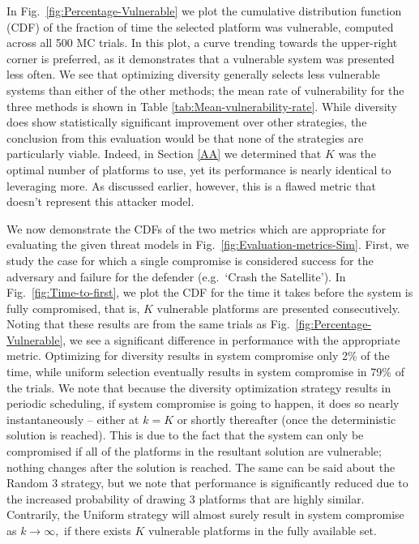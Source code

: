 \documentclass{acm_proc_article-sp}
\begin{document}
In Fig.\ \ref{fig:Percentage-Vulnerable} we plot the cumulative distribution function (CDF) of the fraction of time the selected platform was vulnerable, computed across all 500 MC trials. In this plot, a curve trending towards the upper-right corner is preferred, as it demonstrates that a vulnerable system was presented less often. We see that optimizing diversity generally selects less vulnerable systems than either of the other methods; the mean rate of vulnerability for the three methods is shown in Table \ref{tab:Mean-vulnerability-rate}. While diversity does show statistically significant improvement over other strategies, the conclusion from this evaluation would be that none of the strategies are particularly viable. Indeed, in Section \ref{AA} we determined that $K$ was the optimal number of platforms to use, yet its performance is nearly identical to leveraging more. As discussed earlier, however, this is a flawed metric that doesn't represent this attacker model.

We now demonstrate the CDFs of the two metrics which are appropriate for evaluating the given threat models in Fig.\ \ref{fig:Evaluation-metrics-Sim}. First, we study the case for which a single compromise is considered success for the adversary and failure for the defender (e.g.\ `Crash the Satellite'). In Fig.\ \ref{fig:Time-to-first}, we plot the CDF for the time it takes before the system is fully compromised, that is, $K$ vulnerable platforms are presented consecutively. Noting that these results are from the same trials as Fig.\ \ref{fig:Percentage-Vulnerable}, we see a significant difference in performance with the appropriate metric. Optimizing for diversity results in system compromise only 2\% of the time, while uniform selection eventually results in system compromise in 79\% of the trials. We note that because the diversity optimization strategy results in periodic scheduling, if system compromise is going to happen, it does so nearly instantaneously -- either at $k=K$ or shortly thereafter (once 
the 
deterministic solution is reached). This is due to the fact that the system can only be compromised if all of the platforms in the resultant solution are vulnerable; nothing
changes after the solution is reached. The same can be said about the Random 3 strategy, but we note that performance is significantly reduced due to the increased probability of drawing 3 platforms that are highly similar. Contrarily, the Uniform strategy will almost surely result in system compromise as $k\rightarrow\infty,$ if there exists $K$ vulnerable platforms in the fully available set.
\end{document}
